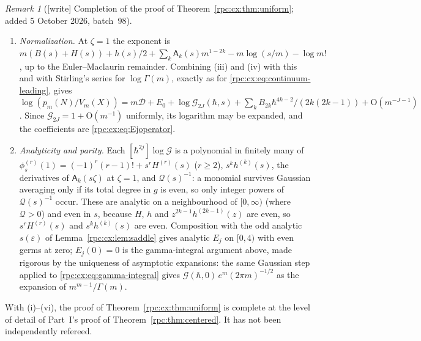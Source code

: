 \documentclass[11pt]{article}
\theoremstyle{definition}
\theoremstyle{remark}
\newtheorem{remark}[theorem]{Remark}
\newcommand{\dd}{\,\mathrm d}
\numberwithin{equation}{section}
\begin{document}
\begin{remark}[\textsf{[write]} Completion of the proof of Theorem~\ref{rpc:cx:thm:uniform}; added 5 October 2026, batch~98]
\begin{enumerate}[label=(\roman*)]
 Lemma~\ref{rpc:cx:lem:small} bounds the integral over
 $\tau m^{-1/2+\delta}\le|\theta|\le1/m$ by
 \[
  \tau\int_{m^{-1/2+\delta}\le|x|\le1}e^{-c'mx^2}\dd x
  +\tau\int_{|x|\ge1}(1+cx^2)^{-m/2}\dd x
  =\mathrm O\bigl(\tau e^{-c''m^{2\delta}}\bigr),
 \]
 using $(1+cx^2)^{-m/2}\le e^{-c'mx^2}$ for $|x|\le1$ and
 $(1+cx^2)^{-m/2}\le(1+c)^{-(m-2)/2}(1+cx^2)^{-1}$ for $|x|\ge1$.
 Lemma~\ref{rpc:cx:lem:large} bounds the integral over
 $1/m\le|\theta|\le\pi$ by $C\tau(1+\log m)e^{-cm}$. Divided by the window
 size $\asymp\tau m^{-1/2}$, both are $\mathrm O(m^{-A})$ for every $A$,
 uniformly in $0<s\le\bar s$: the factor $\tau$ cancels. This is where
 the reserved factor $j=1$ of Lemma~\ref{rpc:cx:lem:large} is essential,
 since $\tau=s/m$ is unbounded below as $N/m^2\to\infty$.
\item \emph{Normalization.} At $\zeta=1$ the exponent is
 $m(B(s)+H(s))+h(s)/2+\sum_k\mathsf A_k(s)m^{1-2k}-m\log(s/m)-\log m!$,
 up to the Euler--Maclaurin remainder. Combining (iii) and (iv) with this and
 with Stirling's series for $\log\Gamma(m)$, exactly as for
 \eqref{rpc:cx:eq:continuum-leading}, gives
 $\log(p_m(N)/V_m(X))=m\mathcal D+E_0+\log\mathcal G_{2J}(\hbar,s)
 +\sum_{k}B_{2k}\hbar^{4k-2}/(2k(2k-1))+\mathrm O(m^{-J-1})$. Since
 $\mathcal G_{2J}=1+\mathrm O(m^{-1})$ uniformly, its logarithm may be expanded,
 and the coefficients are \eqref{rpc:cx:eq:Ejoperator}.
\item \emph{Analyticity and parity.} Each $[\hbar^{2j}]\log\mathcal G$ is a
 polynomial in finitely many of $\phi_s^{(r)}(1)=(-1)^r(r-1)!+s^rH^{(r)}(s)$
 ($r\ge2$), $s^kh^{(k)}(s)$, the derivatives of $\mathsf A_k(s\zeta)$ at
 $\zeta=1$, and $\mathcal Q(s)^{-1}$: a monomial survives Gaussian averaging
 only if its total degree in $g$ is even, so only integer powers of
 $\mathcal Q(s)^{-1}$ occur. These are analytic on a neighbourhood of
 $[0,\infty)$ (where $\mathcal Q>0$) and even in $s$, because $H$, $h$ and
 $z^{2k-1}h^{(2k-1)}(z)$ are even, so $s^rH^{(r)}(s)$ and $s^kh^{(k)}(s)$
 are even. Composition with the odd analytic $s(\varepsilon)$ of
 Lemma~\ref{rpc:cx:lem:saddle} gives analytic $E_j$ on $[0,4)$ with even
 germs at zero; $E_j(0)=0$ is the gamma-integral argument above, made
 rigorous by the uniqueness of asymptotic expansions: the same Gaussian step
 applied to \eqref{rpc:cx:eq:gamma-integral} gives
 $\mathcal G(\hbar,0)\,e^m(2\pi m)^{-1/2}$ as the expansion of
 $m^{m-1}/\Gamma(m)$.
\end{enumerate}
With (i)--(vi), the proof of Theorem~\ref{rpc:cx:thm:uniform} is complete
at the level of detail of Part~I's proof of Theorem~\ref{rpc:thm:centered}.
It has not been independently refereed.
\end{remark}
\end{document}
